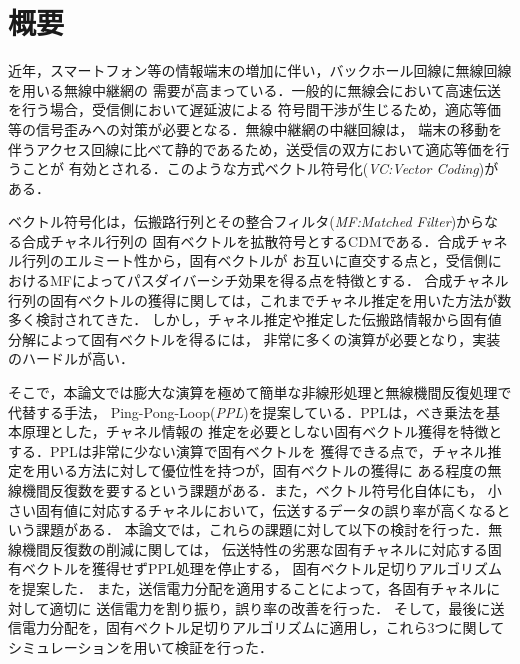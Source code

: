 \chapter*{概要} %

近年，スマートフォン等の情報端末の増加に伴い，バックホール回線に無線回線を用いる無線中継網の
需要が高まっている．一般的に無線会において高速伝送を行う場合，受信側において遅延波による
符号間干渉が生じるため，適応等価等の信号歪みへの対策が必要となる．無線中継網の中継回線は，
端末の移動を伴うアクセス回線に比べて静的であるため，送受信の双方において適応等価を行うことが
有効とされる．このような方式ベクトル符号化(\emph{VC:Vector Coding})がある．

ベクトル符号化は，伝搬路行列とその整合フィルタ(\emph{MF:Matched Filter})からなる合成チャネル行列の
固有ベクトルを拡散符号とするCDMである．合成チャネル行列のエルミート性から，固有ベクトルが
お互いに直交する点と，受信側におけるMFによってパスダイバーシチ効果を得る点を特徴とする．
合成チャネル行列の固有ベクトルの獲得に関しては，これまでチャネル推定を用いた方法が数多く検討されてきた．
しかし，チャネル推定や推定した伝搬路情報から固有値分解によって固有ベクトルを得るには，
非常に多くの演算が必要となり，実装のハードルが高い．

そこで，本論文では膨大な演算を極めて簡単な非線形処理と無線機間反復処理で代替する手法，
Ping-Pong-Loop(\emph{PPL})を提案している．PPLは，べき乗法を基本原理とした，チャネル情報の
推定を必要としない固有ベクトル獲得を特徴とする．PPLは非常に少ない演算で固有ベクトルを
獲得できる点で，チャネル推定を用いる方法に対して優位性を持つが，固有ベクトルの獲得に
ある程度の無線機間反復数を要するという課題がある．また，ベクトル符号化自体にも，
小さい固有値に対応するチャネルにおいて，伝送するデータの誤り率が高くなるという課題がある．
本論文では，これらの課題に対して以下の検討を行った．無線機間反復数の削減に関しては，
伝送特性の劣悪な固有チャネルに対応する固有ベクトルを獲得せずPPL処理を停止する，
固有ベクトル足切りアルゴリズムを提案した．
\thispagestyle{empty}
\clearpage
また，送信電力分配を適用することによって，各固有チャネルに対して適切に
送信電力を割り振り，誤り率の改善を行った．
そして，最後に送信電力分配を，固有ベクトル足切りアルゴリズムに適用し，これら3つに関して
シミュレーションを用いて検証を行った．
\thispagestyle{empty}
\clearpage
\addtocounter{page}{-2}